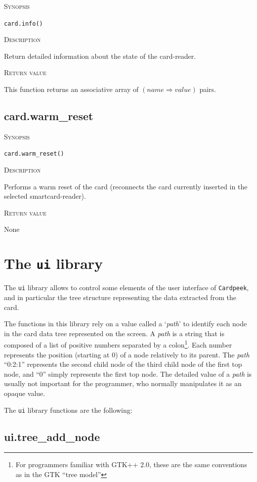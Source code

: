 \documentclass[11pt]{report}
\newcommand{\mansection}[1]{\vspace{0.5em}\par\noindent\textsc{#1}\vspace{0.5em}\par}
\begin{document}
\mansection{Synopsis}
\texttt{card.info()}

\mansection{Description}
  Return detailed information about the state of the card-reader.

\mansection{Return value}
  This function returns an associative array of $(name \Rightarrow value)$ pairs.


\subsection{card.warm\_reset}

\mansection{Synopsis}
\texttt{card.warm\_reset()}

\mansection{Description}
  Performs a warm reset of the card 
  (reconnects the card currently inserted in the selected smartcard-reader).

\mansection{Return value}
  None



\section{The \texttt{ui} library}

The \texttt{ui} library allows to control some elements of the user interface of 
\texttt{Cardpeek}, and in particular the tree structure representing the data 
extracted from the card.

The functions in this library rely on a value called a `\emph{path}' to identify 
each node in the card data tree represented on the screen.
A \emph{path} is a string that is composed of a list of positive numbers separated 
by a colon\footnote{For programmers familiar with GTK++ 2.0, these are the same 
conventions as in the GTK ``tree model''}. 
Each number represents the position (starting at 0) of a node relatively to its parent.
The \emph{path} ``0:2:1'' represents the second child node of the third child 
node of the first top node, and ``0'' simply represents the first top node.
The detailed value of a \emph{path} is usually not important for the programmer, 
who normally manipulates it as an opaque value. 

The \texttt{ui} library functions are the following:


\subsection{ui.tree\_add\_node}
\end{document}
